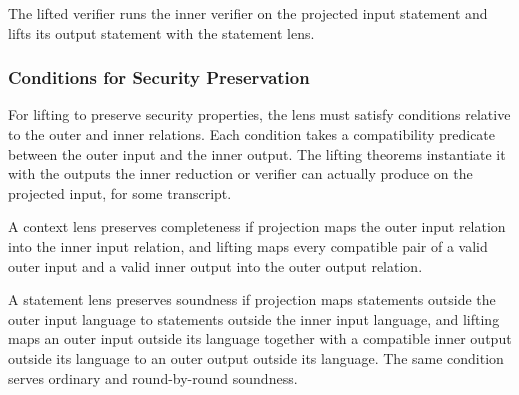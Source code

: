 \begin{definition}
    \label{def:verifier_lift_context}
    The lifted verifier runs the inner verifier on the projected input statement and lifts its
    output statement with the statement lens.
    \leanok
\end{definition}

\begin{definition}
    \label{def:reduction_lift_context}
    \leanok
\end{definition}

\subsubsection{Conditions for Security Preservation}

For lifting to preserve security properties, the lens must satisfy conditions relative to the
outer and inner relations. Each condition takes a compatibility predicate between the outer input
and the inner output. The lifting theorems instantiate it with the outputs the inner reduction or
verifier can actually produce on the projected input, for some transcript.

\begin{definition}
    \label{def:context_lens_is_complete}
    A context lens preserves completeness if projection maps the outer input relation into the
    inner input relation, and lifting maps every compatible pair of a valid outer input and a valid
    inner output into the outer output relation.
    \leanok
\end{definition}

\begin{definition}
    \label{def:statement_lens_is_sound}
    A statement lens preserves soundness if projection maps statements outside the outer input
    language to statements outside the inner input language, and lifting maps an outer input
    outside its language together with a compatible inner output outside its language to an outer
    output outside its language. The same condition serves ordinary and round-by-round soundness.
    \leanok
\end{definition}

